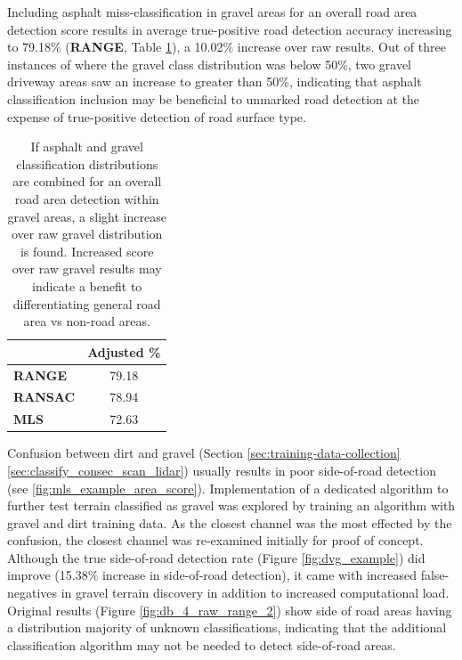 \documentclass[numbered,pdftex]{ohio-etd}
\begin{document}
{{		{Including asphalt miss-classification in gravel areas for an overall road area detection score results in average true-positive road detection accuracy increasing to 79.18\% (\textbf{RANGE}, Table \ref{tab:adjusted_grav_avg_score}), a 10.02\% increase over raw results. Out of three instances of where the gravel class distribution was below 50\%, two gravel driveway areas saw an increase to greater than 50\%, indicating that asphalt classification inclusion may be beneficial to unmarked road detection at the expense of true-positive detection of road surface type.}
	
		\begin{table}[H]
			\centering
			\begin{tabular}{l|c}
									& Adjusted \% \\
				\hline
				\textbf{RANGE}  	& 79.18       \\[-4pt]
				\textbf{RANSAC} 	& 78.94       \\[-4pt]
				\textbf{MLS}    	& 72.63      
			\end{tabular}
			\caption[Adjusted Averaged Gravel Area Score]{If asphalt and gravel classification distributions are combined for an overall road area detection within gravel areas, a slight increase over raw gravel distribution is found. Increased score over raw gravel results may indicate a benefit to differentiating general road area vs non-road areas.}
			\label{tab:adjusted_grav_avg_score}
		\end{table}

		{Confusion between dirt and gravel (Section \ref{sec:training-data-collection} \ref{sec:classify_consec_scan_lidar}) usually results in poor side-of-road detection (see \ref{fig:mls_example_area_score}). Implementation of a dedicated algorithm to further test terrain classified as gravel was explored by training an algorithm with gravel and dirt training data. As the closest channel was the most effected by the confusion, the closest channel was re-examined initially for proof of concept. Although the true side-of-road detection rate (Figure \ref{fig:dvg_example}) did improve (15.38\% increase in side-of-road detection), it came with increased false-negatives in gravel terrain discovery in addition to increased computational load. Original results (Figure \ref{fig:db_4_raw_range_2}) show side of road areas having a distribution majority of unknown classifications, indicating that the additional classification algorithm may not be needed to detect side-of-road areas.} 
		
}}
\end{document}
